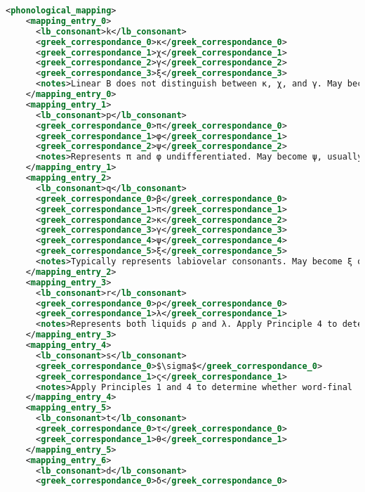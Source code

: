 \begin{lstlisting}[style=mystyle, language=XML, breaklines=true]
  <phonological_mapping>
    <mapping_entry_0>
      <lb_consonant>k</lb_consonant>
      <greek_correspondance_0>κ</greek_correspondance_0>
      <greek_correspondance_1>χ</greek_correspondance_1>
      <greek_correspondance_2>γ</greek_correspondance_2>
      <greek_correspondance_3>ξ</greek_correspondance_3>
      <notes>Linear B does not distinguish between κ, χ, and γ. May become ξ, usually when followed by a syllabogram starting with s. Principle 3: maintain one-to-one correspondences where possible.</notes>
    </mapping_entry_0>
    <mapping_entry_1>
      <lb_consonant>p</lb_consonant>
      <greek_correspondance_0>π</greek_correspondance_0>
      <greek_correspondance_1>φ</greek_correspondance_1>
      <greek_correspondance_2>ψ</greek_correspondance_2>
      <notes>Represents π and φ undifferentiated. May become ψ, usually when followed by a syllabogram starting with s. Principle 1: consider phonetic context to determine the correct correspondence.</notes>
    </mapping_entry_1>
    <mapping_entry_2>
      <lb_consonant>q</lb_consonant>
      <greek_correspondance_0>β</greek_correspondance_0>
      <greek_correspondance_1>π</greek_correspondance_1>
      <greek_correspondance_2>κ</greek_correspondance_2>
      <greek_correspondance_3>γ</greek_correspondance_3>
      <greek_correspondance_4>ψ</greek_correspondance_4>
      <greek_correspondance_5>ξ</greek_correspondance_5>
      <notes>Typically represents labiovelar consonants. May become ξ or ψ, usually when followed by a syllabogram starting with s. Principle 2: ensure transformations follow documented sound change patterns.</notes>
    </mapping_entry_2>
    <mapping_entry_3>
      <lb_consonant>r</lb_consonant>
      <greek_correspondance_0>ρ</greek_correspondance_0>
      <greek_correspondance_1>λ</greek_correspondance_1>
      <notes>Represents both liquids ρ and λ. Apply Principle 4 to determine the most likely correspondence in this specific context.</notes>
    </mapping_entry_3>
    <mapping_entry_4>
      <lb_consonant>s</lb_consonant>
      <greek_correspondance_0>$\sigma$</greek_correspondance_0>
      <greek_correspondance_1>ς</greek_correspondance_1>
      <notes>Apply Principles 1 and 4 to determine whether word-final 'ς' or word-internal 'σ' is appropriate.</notes>
    </mapping_entry_4>
    <mapping_entry_5>
      <lb_consonant>t</lb_consonant>
      <greek_correspondance_0>τ</greek_correspondance_0>
      <greek_correspondance_1>θ</greek_correspondance_1>
    </mapping_entry_5>
    <mapping_entry_6>
      <lb_consonant>d</lb_consonant>
      <greek_correspondance_0>δ</greek_correspondance_0>

\end{lstlisting}
